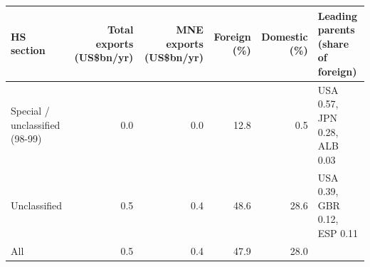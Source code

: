 \begin{tabular}{@{}l r r r r l@{}}
\toprule
HS section & Total exports (US\$bn/yr) & MNE exports (US\$bn/yr) & Foreign (\%) & Domestic (\%) & Leading parents (share of foreign) \\
\midrule
Special / unclassified (98-99) & 0.0 & 0.0 & 12.8 & 0.5 & USA 0.57, JPN 0.28, ALB 0.03 \\
Unclassified & 0.5 & 0.4 & 48.6 & 28.6 & USA 0.39, GBR 0.12, ESP 0.11 \\
\midrule
All & 0.5 & 0.4 & 47.9 & 28.0 & \\
\bottomrule
\end{tabular}
